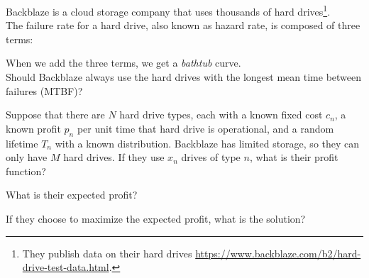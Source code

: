 \begin{slide}
\question

Backblaze is a cloud storage company that uses thousands of hard drives\footnote{They publish data on their hard drives \url{https://www.backblaze.com/b2/hard-drive-test-data.html}.}.\\

The failure rate for a hard drive, also known as hazard rate, is composed of three terms:
\begin{center}
\end{center}

When we add the three terms, we get a \textit{bathtub} curve. \\

Should Backblaze always use the hard drives with the longest mean time between failures (MTBF)?

\begin{parts}
\item Suppose that there are $N$ hard drive types, each with a known fixed cost $c_n$, a known profit $p_n$ per unit time that hard drive is operational, and a random lifetime $T_n$ with a known distribution. Backblaze has limited storage, so they can only have $M$ hard drives. If they use $x_n$ drives of type $n$, what is their profit function?


\item What is their expected profit?

\item If they choose to maximize the expected profit, what is the solution?
\end{parts}

	
\end{slide}


